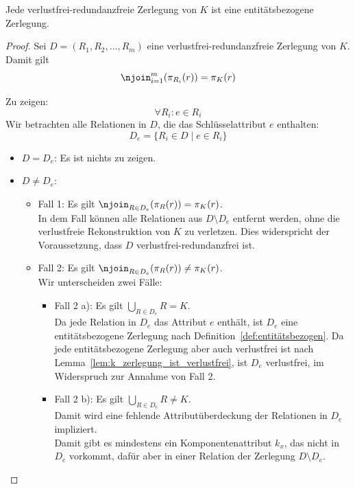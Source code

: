 \bigskip
\begin{lemma}\label{lem:verlustfrei-redundanzfrei-ist-entitätsbezogen}
    Jede verlustfrei-redundanzfreie Zerlegung von $K$ ist eine entitätsbezogene Zerlegung.
\end{lemma}
\begin{proof}
    Sei $D = (R_{1}, R_{2}, \ldots, R_{m})$ eine verlustfrei-redundanzfreie Zerlegung von $K$.
    Damit gilt
    \[
        \njoin_{i=1}^m(\pi_{R_{i}}(r)) = \pi_{K}(r)
    \]

    Zu zeigen:
    \[
        \forall R_{i}: e \in R_{i}
    \]
    Wir betrachten alle Relationen in $D$, die das Schlüsselattribut $e$ enthalten:
    \[
        D_e =\{R_i \in D \mid e \in R_i \}
    \]
    \begin{itemize}
        \item $D = D_e$: Es ist nichts zu zeigen.
        \item $D \neq D_e$:
        \begin{itemize}
            \item Fall 1: Es gilt $\njoin_{R \in D_e}(\pi_{R}(r)) = \pi_{K}(r)$.\\
            In dem Fall können alle Relationen aus $D \setminus D_e$ entfernt werden, ohne die verlustfreie Rekonstruktion von $K$ zu verletzen.
            Dies widerspricht der Voraussetzung, dass $D$ verlustfrei-redundanzfrei ist.
            \item Fall 2: Es gilt $\njoin_{R \in D_e}(\pi_{R}(r)) \neq \pi_{K}(r)$.\\
            Wir unterscheiden zwei Fälle:
            \begin{itemize}
                \item[] Fall 2 a): Es gilt $\bigcup_{R \in D_e} R = K$.\\
                Da jede Relation in $D_e$ das Attribut $e$ enthält, ist $D_e$ eine entitätsbezogene Zerlegung nach Definition~\ref{def:entitätsbezogen}.
                Da jede entitätsbezogene Zerlegung aber auch verlustfrei ist nach Lemma~\ref{lem:k_zerlegung_ist_verlustfrei}, ist $D_e$ verlustfrei, im Widerspruch zur Annahme von Fall 2.
                \item[] Fall 2 b):  Es gilt $\bigcup_{R \in D_e} R \neq K$.\\
                Damit wird eine fehlende Attributüberdeckung der Relationen in $D_e$ impliziert.\\
                \noindent
                Damit gibt es mindestens ein Komponentenattribut $k_x$, das nicht in $D_e$ vorkommt, dafür aber in einer Relation der Zerlegung $D \setminus D_e$.

\end{itemize}
\end{itemize}
\end{itemize}
\end{proof}
